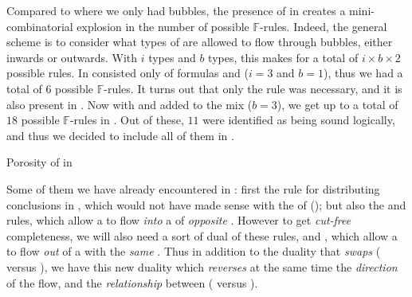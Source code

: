 \begin{description}
  Compared to  where we only had  bubbles, the presence of
    in  creates a mini-combinatorial explosion in
  the number of possible $\mathbb{F}$-rules. Indeed, the general scheme is to
  consider what types of  are allowed to flow through bubbles, either
  inwards or outwards. With $i$  types and $b$  types, this makes for
  a total of $i \times b \times 2$ possible rules. In   consisted
  only of  formulas and   ($i = 3$ and $b = 1$), thus we
  had a total of $6$ possible $\mathbb{F}$-rules. It turns out that only the
   rule was necessary, and it is also present in . Now with  and   added to the mix ($b = 3$), we
  get up to a total of $18$ possible $\mathbb{F}$-rules in . Out
  of these, $11$ were identified as being sound logically, and thus we decided
  to include all of them in .

  \begin{marginfigure}
    \caption{Porosity of  in }
  \end{marginfigure}
  
  Some of them we have already encountered in : first the
   rule for distributing conclusions in , which
  would not have made sense with the  of 
  (); but also the  and
   rules, which allow a   to flow
  \emph{into} a  of \emph{opposite} . However to get
  \emph{cut-free} completeness, we will also need a sort of dual of these rules,
   and , which allow a 
   to flow \emph{out} of a  with the \emph{same} . Thus in
  addition to the duality that \emph{swaps} 
  ( versus ), we have this new
  duality which \emph{reverses} at the same time the \emph{direction} of the
  flow, and the \emph{relationship} between 
  ( versus ).


\end{description}
